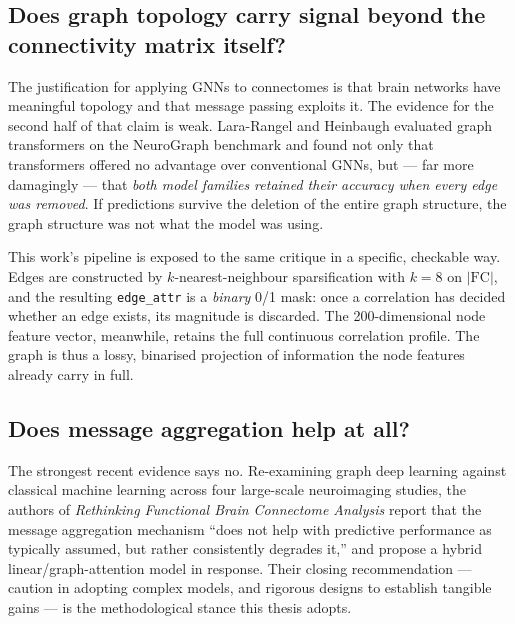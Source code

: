 \subsection{Does graph topology carry signal beyond the connectivity matrix itself?}
\label{sec:gap-topology}

The justification for applying GNNs to connectomes is that brain networks have meaningful
topology and that message passing exploits it. The evidence for the second half of that
claim is weak. Lara-Rangel and Heinbaugh evaluated graph transformers on the NeuroGraph
benchmark and found not only that transformers offered no advantage over conventional
GNNs, but --- far more damagingly --- that \emph{both model families retained their
accuracy when every edge was removed}. If predictions survive the deletion of the entire
graph structure, the graph structure was not what the model was using.

This work's pipeline is exposed to the same critique in a specific, checkable way. Edges
are constructed by $k$-nearest-neighbour sparsification with $k = 8$ on $|\mathrm{FC}|$,
and the resulting \texttt{edge\_attr} is a \emph{binary} 0/1 mask: once a correlation has
decided whether an edge exists, its magnitude is discarded. The 200-dimensional node
feature vector, meanwhile, retains the full continuous correlation profile. The graph is
thus a lossy, binarised projection of information the node features already carry in full.


\subsection{Does message aggregation help at all?}
\label{sec:gap-aggregation}

The strongest recent evidence says no. Re-examining graph deep learning against classical
machine learning across four large-scale neuroimaging studies, the authors of
\emph{Rethinking Functional Brain Connectome Analysis} report that the message aggregation
mechanism ``does not help with predictive performance as typically assumed, but rather
consistently degrades it,'' and propose a hybrid linear/graph-attention model in response.
Their closing recommendation --- caution in adopting complex models, and rigorous designs
to establish tangible gains --- is the methodological stance this thesis adopts.

